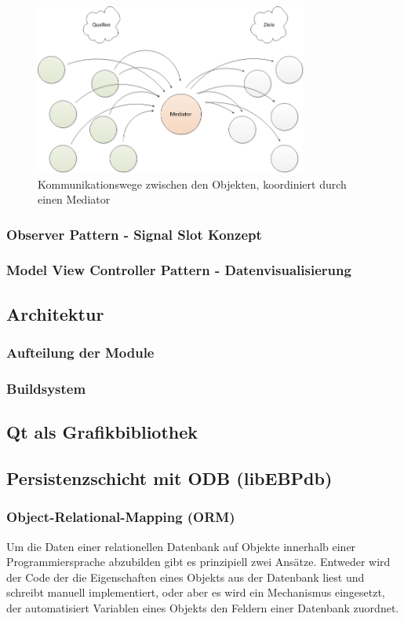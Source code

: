 \begin{figure}[htp]
	\includegraphics[width=0.8\textwidth]{mediated}
	\caption{Kommunikationswege zwischen den Objekten, koordiniert durch einen Mediator}
	\label{unstrukturiert}
\end{figure}
\subsubsection{Observer Pattern - Signal Slot Konzept}
\subsubsection{Model View Controller Pattern - Datenvisualisierung}

\subsection{Architektur}
\subsubsection{Aufteilung der Module}
\subsubsection{Buildsystem}

\subsection{Qt als Grafikbibliothek}

\subsection{Persistenzschicht mit ODB (libEBPdb)}
\subsubsection{Object-Relational-Mapping (ORM)}
Um die Daten einer relationellen Datenbank auf Objekte innerhalb einer Programmiersprache abzubilden gibt es prinzipiell zwei Ansätze.
Entweder wird der Code der die Eigenschaften eines Objekts aus der Datenbank liest und schreibt manuell implementiert, oder aber es wird ein 
Mechanismus eingesetzt, der automatisiert Variablen eines Objekts den Feldern einer Datenbank zuordnet.
